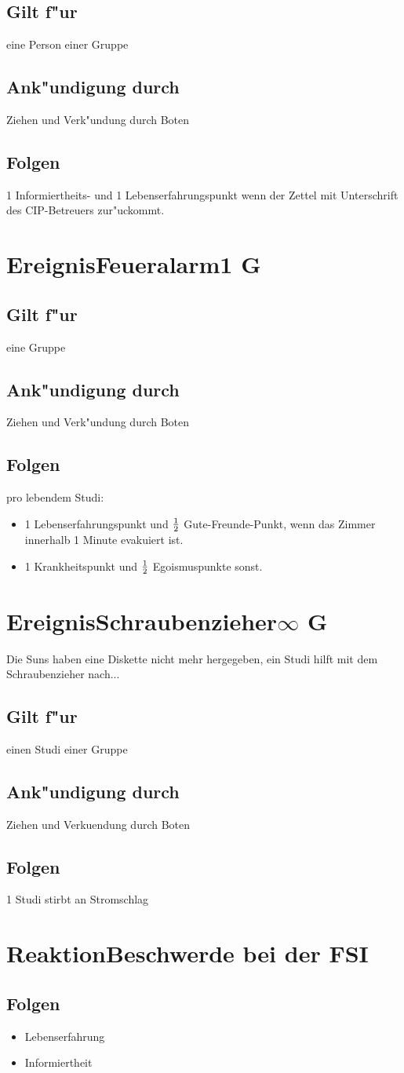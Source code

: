 \documentclass[a4paper,12pt]{article}
\def\Ereignis#1{\newpage\section[#1]{Ereignis\hfil\break#1}}
\def\Ereigniss#1#2{\Ereignis{#1\hfill#2}}
\def\Aktion#1{\newpage\section[#1]{Reaktion\hfil\break#1}}
\def\Folgen{\subsection*{Folgen}}
\def\fuer{\subsection*{Gilt f"ur}}
\def\Ankuendigung{\subsection*{Ank"undigung durch}}
\def\bi{\begin{itemize}}
\def\ei{\end{itemize}}
\begin{document}
\fuer

eine Person einer Gruppe

\Ankuendigung

Ziehen und Verk"undung durch Boten

\Folgen

1 Informiertheits- und 1 Lebenserfahrungspunkt wenn der Zettel
mit Unterschrift des CIP-Betreuers zur"uckommt.

\Ereigniss{Feueralarm}{1 G}

\fuer 

eine Gruppe

\Ankuendigung

Ziehen und Verk"undung durch Boten

\Folgen

pro lebendem Studi:
\bi
\item 1 Lebenserfahrungspunkt und $1 \over 2$ Gute-Freunde-Punkt, 
  wenn das Zimmer innerhalb 1 Minute evakuiert ist.
\item 1 Krankheitspunkt und $1 \over 2$ Egoismuspunkte sonst.
\ei

\Ereigniss{Schraubenzieher}{$\infty$ G}
Die Suns haben eine Diskette nicht mehr hergegeben, ein Studi
hilft mit dem Schraubenzieher nach...

\fuer

einen Studi einer Gruppe

\Ankuendigung

Ziehen und Verkuendung durch Boten

\Folgen

1 Studi stirbt an Stromschlag

\Aktion{Beschwerde bei der FSI}

\Folgen

\bi
\item Lebenserfahrung
\item Informiertheit
\ei
\end{document}
